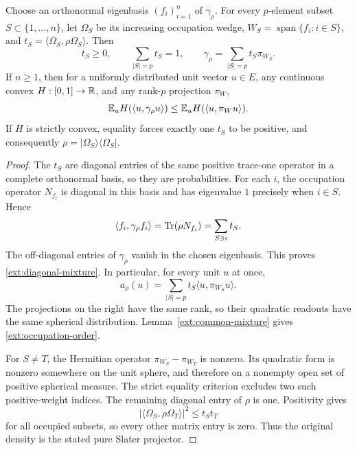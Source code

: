 \begin{lemma}
\label{ext:occupation-mixture}
Choose an orthonormal eigenbasis $(f_i)_{i=1}^n$ of $\gamma_\rho$.
For every $p$-element subset $S\subset\{1,\ldots,n\}$, let
$\Omega_S$ be its increasing occupation wedge,
$W_S=\operatorname{span}\{f_i:i\in S\}$, and
$t_S=\langle\Omega_S,\rho\Omega_S\rangle$. Then
\begin{equation}
 t_S\ge0,\qquad \sum_{|S|=p}t_S=1,
 \qquad
 \gamma_\rho=\sum_{|S|=p}t_S\pi_{W_S}.
 \label{ext:diagonal-mixture}
\end{equation}
If $n\ge1$, then for a uniformly distributed unit vector $u\in E$,
any continuous convex $H:[0,1]\to\mathbb R$, and any rank-$p$ projection $\pi_W$,
\begin{equation}
 \mathbb E_u H(\langle u,\gamma_\rho u\rangle)
 \le \mathbb E_u H(\langle u,\pi_Wu\rangle).
 \label{ext:occupation-order}
\end{equation}
If $H$ is strictly convex, equality forces exactly one $t_S$ to be
positive, and consequently $\rho=|\Omega_S\rangle\langle\Omega_S|$.
\end{lemma}
\begin{proof}
The $t_S$ are diagonal entries of the same positive trace-one operator
in a complete orthonormal basis, so they are probabilities. For each
$i$, the occupation operator $N_{f_i}$ is diagonal in this basis and
has eigenvalue $1$ precisely when $i\in S$. Hence
\[
 \langle f_i,\gamma_\rho f_i\rangle
 =\operatorname{Tr}(\rho N_{f_i})=\sum_{S\ni i}t_S.
\]
The off-diagonal entries of $\gamma_\rho$ vanish in the chosen
eigenbasis. This proves \eqref{ext:diagonal-mixture}.
In particular, for every unit $u$ at once,
\[
 a_\rho(u)=\sum_{|S|=p}t_S\langle u,\pi_{W_S}u\rangle.
\]
The projections on the right have the same rank, so their quadratic
readouts have the same spherical distribution. Lemma~\ref{ext:common-mixture}
gives \eqref{ext:occupation-order}.

For $S\ne T$, the Hermitian operator $\pi_{W_S}-\pi_{W_T}$ is
nonzero. Its quadratic form is nonzero somewhere on the unit sphere,
and therefore on a nonempty open set of positive spherical measure.
The strict equality criterion excludes two such positive-weight
indices. The remaining diagonal entry of $\rho$ is one. Positivity
gives
\[
 |\langle\Omega_S,\rho\Omega_T\rangle|^2
 \le t_S t_T
\]
for all occupied subsets, so every other matrix entry is zero.
Thus the original density is the stated pure Slater projector.
\end{proof}

